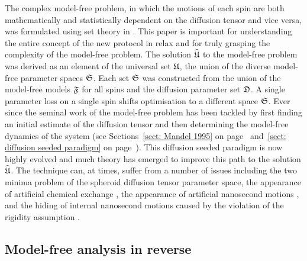\begin{htmlonly}
\begin{htmlonly}
The complex model-free problem, in which the motions of each spin are both mathematically and statistically dependent on the diffusion tensor and vice versa, was formulated using set theory in \citet{dAuvergneGooley07}.  This paper is important for understanding the entire concept of the new protocol in relax and for truly grasping the complexity of the model-free problem.  The solution $\widehat{\mathfrak{U}}$ to the model-free problem was derived as an element of the universal set $\mathfrak{U}$, the union of the diverse model-free parameter spaces $\mathfrak{S}$.  Each set $\mathfrak{S}$ was constructed from the union of the model-free models $\mathfrak{F}$ for all spins and the diffusion parameter set $\mathfrak{D}$.  A single parameter loss on a single spin shifts optimisation to a different space $\mathfrak{S}$.  Ever since the seminal work of \citet{Kay89} the model-free problem has been tackled by first finding an initial estimate of the diffusion tensor and then determining the model-free dynamics of the system (see Sections~\ref{sect: Mandel 1995} on page~\pageref{sect: Mandel 1995} and~\ref{sect: diffusion seeded paradigm} on page~\pageref{sect: diffusion seeded paradigm}).  This diffusion seeded paradigm is now highly evolved and much theory has emerged to improve this path to the solution $\widehat{\mathfrak{U}}$.  The technique can, at times, suffer from a number of issues including the two minima problem of the spheroid diffusion tensor parameter space, the appearance of artificial chemical exchange \citep{Tjandra96}, the appearance of artificial nanosecond motions \citep{Schurr94}, and the hiding of internal nanosecond motions caused by the violation of the rigidity assumption \citep{Orekhov95b, Orekhov99b, Orekhov99a}.




\subsection{Model-free analysis in reverse}


\end{htmlonly}
\end{htmlonly}
